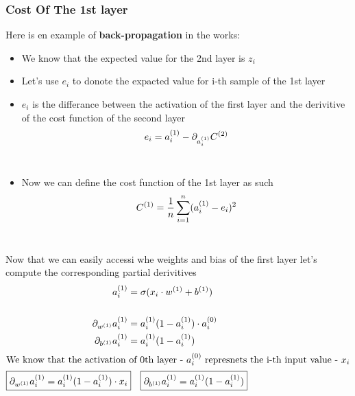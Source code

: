 \documentclass{article}
\begin{document}
\subsubsection{Cost Of The 1st layer}
Here is en example of \textbf{back-propagation} in the works:
\begin{itemize}
    \item {We know that the expected value for the 2nd layer is $z_i$} 
    \item {Let's use $e_i$ to donote the expacted value for i-th sample of the 1st layer} 
    \item {$e_i$} is the differance between the activation of the first layer and the derivitive of the cost function of the second layer
    $$e_i = \arg[a_i, 1] - \pd[{\arg[a_i, 1]}]C^{(2)}$$ \\
    \item{Now we can define the cost function of the 1st layer as such}
    $$\arg[C, 1] = \avgsum[i, n] (\arg[a_i, 1] - e_i)^2$$ \\
\end{itemize}
\newpage 
\noindent Now that we can easily accessi whe weights and bias of the first layer let's compute the corresponding partial derivitives
\begin{align}
    \arg[a_i, 1] &= \sigma(x_i \cdot w^{(1)} + b^{(1)})\\
    \\
    \pd[{\arg[w, 1]}]\arg[a_i, 1] 
                 &= \arg[a_i, 1](1 - \arg[a_i, 1]) \cdot \arg[a_i, 0] \\ 
    \pd[{\arg[b, 1]}]\arg[a_i, 1] 
                 &= \arg[a_i, 1](1 - \arg[a_i, 1])  \\ 
    \intertext{We know that the activation of 0th layer - $\arg[a_i, 0]$ represnets the i-th input value - $x_i$}
    \Aboxed{\pd[{\arg[w, 1]}]\arg[a_i, 1] =\arg[a_i, 1](1 - \arg[a_i, 1]) \cdot x_i}
    \Aboxed{\pd[{\arg[b, 1]}]\arg[a_i, 1] = \arg[a_i, 1](1 - \arg[a_i, 1])}   
\end{align}
\end{document}
